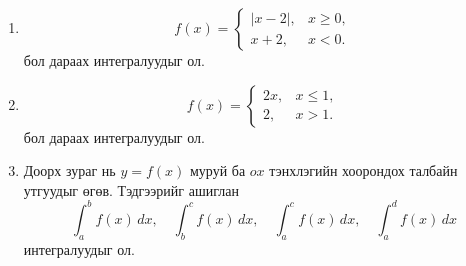 \begin{enumerate}
\begin{enumerate}
\item $f(x)=2x-x^2$, \quad завсар: $[-1,\,3]$
\end{enumerate}
\item \[
f(x)=
\begin{cases}
|x-2|, & x\ge0,\\[4pt]
x+2, & x<0.
\end{cases}
\] бол дараах интегралуудыг ол.
\begin{enumerate}
\end{enumerate}
\item 
\[
f(x)=
\begin{cases}
2x, & x\le1,\\[4pt]
2, & x>1.
\end{cases}
\]
бол дараах интегралуудыг ол.
\begin{enumerate}
\end{enumerate}
\item Доорх зураг нь $y=f(x)$ муруй ба $ox$ тэнхлэгийн хоорондох талбайн утгуудыг өгөв. Тэдгээрийг ашиглан 
$$
\int_a^b f(x)\,dx,\quad
\int_b^c f(x)\,dx,\quad
\int_a^c f(x)\,dx,\quad
\int_a^d f(x)\,dx
$$ интегралуудыг ол.
\begin{figure}[h]
\centering
{}
\end{figure}
\end{enumerate}
